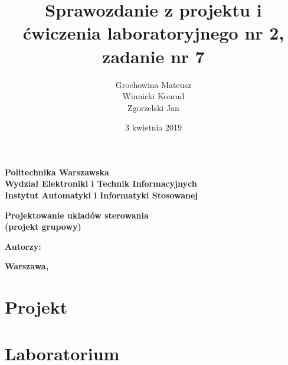 \documentclass[a4paper,titlepage,11pt,twosides,floatssmall]{mwrep}
\begin{document}
\frenchspacing
\pagestyle{uheadings}

\title{\bf Sprawozdanie z projektu i ćwiczenia laboratoryjnego nr 2, zadanie nr 7\vskip 0.1cm}
\author{Grochowina Mateusz\\Winnicki Konrad\\Zgorzelski Jan}
\date{ 3 kwietnia 2019}

\makeatletter
\renewcommand{\maketitle}{\begin{titlepage}
\begin{center}
{\LARGE {\bf Politechnika Warszawska}}\\
\vspace{0.4cm}
{\LARGE {\bf Wydział Elektroniki i Technik Informacyjnych}}\\
\vspace{0.2cm}
{\LARGE {\bf Instytut Automatyki i Informatyki Stosowanej}}\\
\end{center}
\vspace{5cm}
\begin{center}
{\bf \LARGE Projektowanie ukladów sterowania\\ (projekt grupowy) \vskip 0.1cm}
\end{center}
\vspace{1cm}
\begin{center}
{\bf \LARGE \@title}
\end{center}
\vspace{7cm}
{\bf Autorzy:\\ \Large \@author \par}
\vspace*{\stretch{6}}
\begin{center}
\bf{\large{Warszawa, \@date\vskip 0.1cm}}
\end{center}
\end{titlepage}
}
\makeatother

\maketitle

\tableofcontents
\chapter{Projekt}








\chapter{Laboratorium}





\end{document}
